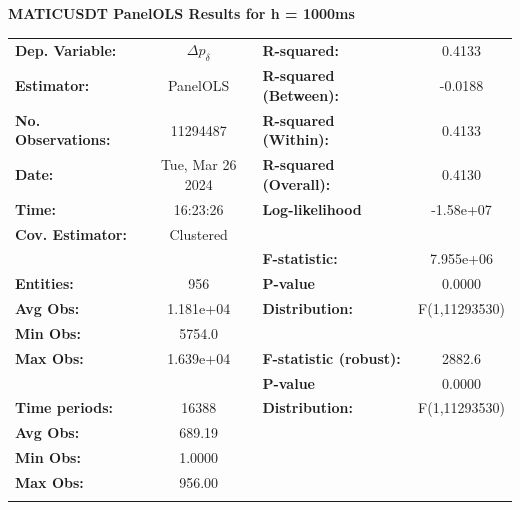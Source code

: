 \begin{table}
\textbf{MATICUSDT PanelOLS Results for h = 1000ms}
\begin{center}
\begin{tabular}{lclc}
\hline
\textbf{Dep. Variable:}    &         $\Delta p_{\delta}$         & \textbf{  R-squared:         }   &      0.4133      \\
\textbf{Estimator:}        &      PanelOLS      & \textbf{  R-squared (Between):}  &     -0.0188      \\
\textbf{No. Observations:} &      11294487      & \textbf{  R-squared (Within):}   &      0.4133      \\
\textbf{Date:}             &  Tue, Mar 26 2024  & \textbf{  R-squared (Overall):}  &      0.4130      \\
\textbf{Time:}             &      16:23:26      & \textbf{  Log-likelihood     }   &    -1.58e+07     \\
\textbf{Cov. Estimator:}   &     Clustered      & \textbf{                     }   &                  \\
\textbf{}                  &                    & \textbf{  F-statistic:       }   &    7.955e+06     \\
\textbf{Entities:}         &        956         & \textbf{  P-value            }   &      0.0000      \\
\textbf{Avg Obs:}          &     1.181e+04      & \textbf{  Distribution:      }   &  F(1,11293530)   \\
\textbf{Min Obs:}          &       5754.0       & \textbf{                     }   &                  \\
\textbf{Max Obs:}          &     1.639e+04      & \textbf{  F-statistic (robust):} &      2882.6      \\
\textbf{}                  &                    & \textbf{  P-value            }   &      0.0000      \\
\textbf{Time periods:}     &       16388        & \textbf{  Distribution:      }   &  F(1,11293530)   \\
\textbf{Avg Obs:}          &       689.19       & \textbf{                     }   &                  \\
\textbf{Min Obs:}          &       1.0000       & \textbf{                     }   &                  \\
\textbf{Max Obs:}          &       956.00       & \textbf{                     }   &                  \\
\textbf{}                  &                    & \textbf{                     }   &                  \\

\end{tabular}
\end{center}
\end{table}
